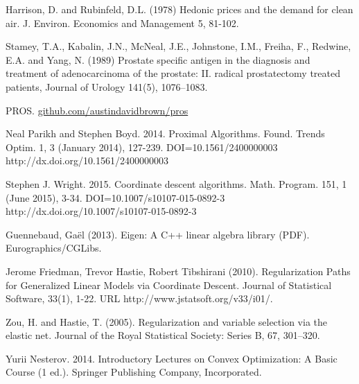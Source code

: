 \documentclass[10pt, reqno]{article}
\numberwithin{equation}{section}
\begin{document}
%
%
\newpage
\small
\begin{thebibliography}{1}

Harrison, D. and Rubinfeld, D.L. (1978) Hedonic prices and the
     demand for clean air.  J. Environ. Economics and Management 5,
     81-102.

Stamey, T.A., Kabalin, J.N., McNeal, J.E., Johnstone, I.M., Freiha, F., Redwine, E.A. and Yang, N. (1989)
Prostate specific antigen in the diagnosis and treatment of adenocarcinoma of the prostate: II. radical prostatectomy treated patients, Journal of Urology 141(5), 1076–1083.

PROS. \href{https://github.com/austindavidbrown/pros}{github.com/austindavidbrown/pros}

Neal Parikh and Stephen Boyd. 2014. Proximal Algorithms. Found. Trends Optim. 1, 3 (January 2014), 127-239. DOI=10.1561/2400000003 http://dx.doi.org/10.1561/2400000003

Stephen J. Wright. 2015. Coordinate descent algorithms. Math. Program. 151, 1 (June 2015), 3-34. DOI=10.1007/s10107-015-0892-3 http://dx.doi.org/10.1007/s10107-015-0892-3

Guennebaud, Gaël (2013). Eigen: A C++ linear algebra library (PDF). Eurographics/CGLibs.

Jerome Friedman, Trevor Hastie, Robert Tibshirani (2010). Regularization Paths for Generalized Linear Models via Coordinate Descent. Journal of Statistical Software, 33(1), 1-22. URL http://www.jstatsoft.org/v33/i01/.

Zou, H. and Hastie, T. (2005). Regularization and variable selection via the elastic net. Journal of the Royal Statistical Society: Series B, 67, 301–320.

Yurii Nesterov. 2014. Introductory Lectures on Convex Optimization: A Basic Course (1 ed.). Springer Publishing Company, Incorporated.

\end{thebibliography}
\end{document}
